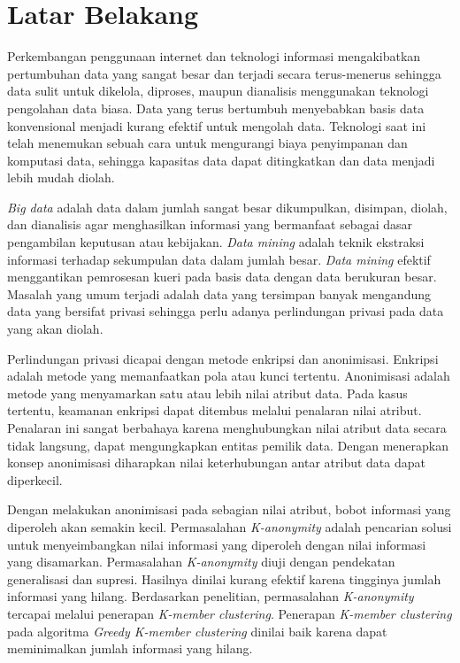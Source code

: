 \documentclass[a4paper,twoside]{article}
\begin{document}
\section{Latar Belakang}
Perkembangan penggunaan internet dan teknologi informasi mengakibatkan pertumbuhan data yang sangat besar dan terjadi secara terus-menerus sehingga data sulit untuk dikelola, diproses, maupun dianalisis menggunakan teknologi pengolahan data biasa. Data yang terus bertumbuh menyebabkan basis data konvensional menjadi kurang efektif untuk mengolah data. Teknologi saat ini telah menemukan sebuah cara untuk mengurangi biaya penyimpanan dan komputasi data, sehingga kapasitas data dapat ditingkatkan dan data menjadi lebih mudah diolah.

{\it Big data} adalah data dalam jumlah sangat besar dikumpulkan, disimpan, diolah, dan dianalisis agar menghasilkan informasi yang bermanfaat sebagai dasar pengambilan keputusan atau kebijakan. {\it Data mining} adalah teknik ekstraksi informasi terhadap sekumpulan data dalam jumlah besar. {\it Data mining} efektif menggantikan pemrosesan kueri pada basis data dengan data berukuran besar. Masalah yang umum terjadi adalah data yang tersimpan banyak mengandung data yang bersifat privasi sehingga perlu adanya perlindungan privasi pada data yang akan diolah.

Perlindungan privasi dicapai dengan metode enkripsi dan anonimisasi. Enkripsi adalah metode yang memanfaatkan pola atau kunci tertentu. Anonimisasi adalah metode yang menyamarkan satu atau lebih nilai atribut data. Pada kasus tertentu, keamanan enkripsi dapat ditembus melalui penalaran nilai atribut. Penalaran ini sangat berbahaya karena menghubungkan nilai atribut data secara tidak langsung, dapat mengungkapkan entitas pemilik data. Dengan menerapkan konsep anonimisasi diharapkan nilai keterhubungan antar atribut data dapat diperkecil.

Dengan melakukan anonimisasi pada sebagian nilai atribut, bobot informasi yang diperoleh akan semakin kecil. Permasalahan {\it K-anonymity} adalah pencarian solusi untuk menyeimbangkan nilai informasi yang diperoleh dengan nilai informasi yang disamarkan. Permasalahan {\it K-anonymity} diuji dengan pendekatan generalisasi dan supresi. Hasilnya dinilai kurang efektif karena tingginya jumlah informasi yang hilang. Berdasarkan penelitian, permasalahan {\it K-anonymity} tercapai melalui penerapan {\it K-member clustering}. Penerapan {\it K-member clustering} pada algoritma {\it Greedy K-member clustering} dinilai baik karena dapat meminimalkan jumlah informasi yang hilang.
\end{document}
